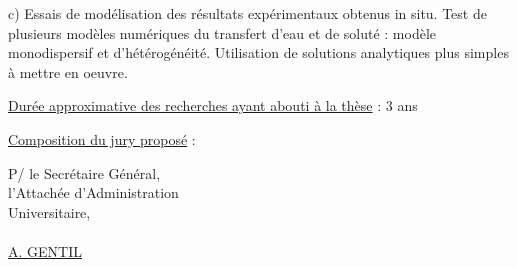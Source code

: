 c) Essais de modélisation des résultats expérimentaux obtenus in situ. Test de plusieurs modèles numériques du transfert d'eau et de soluté : modèle monodispersif et d'hétérogénéité. Utilisation de solutions analytiques plus simples à mettre en oeuvre.

\uline{Durée approximative des recherches ayant abouti à la thèse} : 3 ans

\uline{Composition du jury proposé} :

P/ le Secrétaire Général,\\
l'Attachée d'Administration\\
Universitaire,\\
\\
\uline{A. GENTIL}
